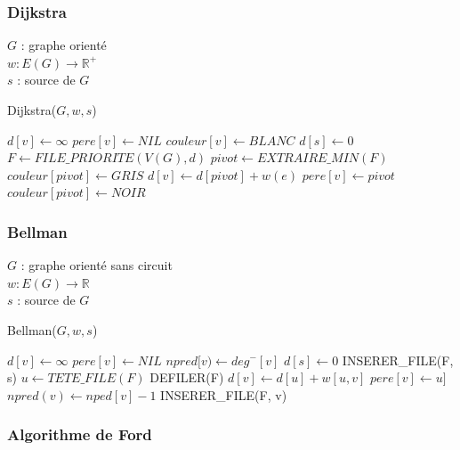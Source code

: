 \documentclass[11pt,a4paper]{report}
\begin{document}
\subsubsection{Dijkstra}

\noindent
$G$ : graphe orienté\\
$w: E(G) \rightarrow \mathbb{R}^+$ \\ 
$s$ : source de $G$

\begin{algorithm}
\caption{Dijkstra($G, w, s$)}
\begin{algorithmic}[1]
\STATE $d[v] \leftarrow \infty$
\STATE $pere[v] \leftarrow NIL$
\STATE $couleur[v] \leftarrow BLANC$
\ENDFOR
\STATE $d[s] \leftarrow 0$
\STATE $F \leftarrow FILE\_PRIORITE(V(G), d)$
\STATE $pivot \leftarrow EXTRAIRE\_MIN(F)$
\STATE $couleur[pivot] \leftarrow GRIS$
\STATE $d[v]  \leftarrow d[pivot] + w(e)$
\STATE $pere[v]  \leftarrow pivot$
\ENDIF
\ENDFOR
\STATE $couleur[pivot] \leftarrow NOIR$
\ENDWHILE
\end{algorithmic}
\end{algorithm}


\subsubsection{Bellman}

\noindent
$G$ : graphe orienté sans circuit\\
$w: E(G) \rightarrow \mathbb{R}$ \\ 
$s$ : source de $G$


\begin{algorithm}
\caption{Bellman($G, w, s$)}
\begin{algorithmic}[1]
\STATE $d[v] \leftarrow \infty$
\STATE $pere[v] \leftarrow NIL$
\STATE $npred[v) \leftarrow deg^-[v]$
\ENDFOR
\STATE $d[s] \leftarrow 0$ 
\STATE INSERER\_FILE(F, s)
\STATE $u \leftarrow TETE\_FILE(F)$
\STATE DEFILER(F)
\STATE $d[v] \leftarrow d[u] + w[u,v]$
\STATE $pere[v] \leftarrow u]$
\ENDIF
\STATE $npred(v) \leftarrow nped[v] - 1$
\STATE INSERER\_FILE(F, v)
\ENDIF
\ENDFOR
\ENDWHILE
\end{algorithmic}
\end{algorithm}

\subsubsection{Algorithme de Ford}
\end{document}
